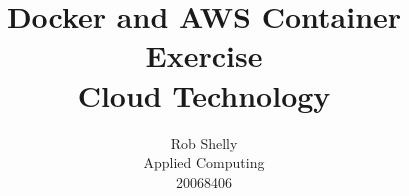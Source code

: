 \documentclass[]{article}
\title{Docker and AWS Container Exercise\\
	Cloud Technology}
\author{Rob Shelly\\
	Applied Computing\\
	20068406}
\begin{document}
\maketitle
\thispagestyle{empty}

\newpage
{}
\tableofcontents

\newpage
{}





\begin{appendices}




\end{appendices}
\end{document}
